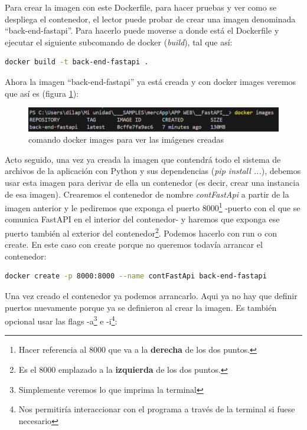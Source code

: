\documentclass[a4paper,12pt]{report}
\begin{document}
	Para crear la imagen con este Dockerfile, para hacer pruebas y ver como se despliega el contenedor, el lector puede probar de crear una imagen denominada ``back-end-fastapi''. Para hacerlo puede moverse a donde está el Dockerfile y ejecutar el siguiente subcomando de docker (\textit{build}), tal que así:
	
	\begin{lstlisting}[language=bash]
		docker build -t back-end-fastapi .
	\end{lstlisting}
	
		Ahora la imagen ``back-end-fastapi'' ya está creada y con docker images veremos que así es (figura \ref{fig:dockerimages}):
	\FloatBarrier
	\begin{figure}[H]
		\centering
		\caption{comando docker images para ver las imágenes creadas}
		\label{fig:dockerimages}
		\includegraphics[width=1\linewidth]{img/dockerImages}
	\end{figure}
	\FloatBarrier
	

	
	Acto seguido, una vez ya creada la imagen que contendrá todo el sistema de archivos de la aplicación con Python y sus dependencias (\textit{pip install ...}), debemos usar esta imagen para derivar de ella un contenedor (es decir, crear una instancia de esa imagen). Crearemos el contenedor de nombre \textit{contFastApi} a partir de la imagen anterior y le pediremos que exponga el puerto 8000\footnote{Hacer referencia al 8000 que va a la \textbf{derecha} de los dos puntos.} -puerto con el que se comunica FastAPI en el interior del contenedor- y haremos que exponga ese puerto también al exterior del contenedor\footnote{Es el 8000 emplazado a la \textbf{izquierda} de los dos puntos.}. Podemos hacerlo con run o con create. En este caso con create porque no queremos todavía arrancar el contenedor:
	
	\begin{lstlisting}[language=bash]
docker create -p 8000:8000 --name contFastApi back-end-fastapi
	\end{lstlisting}

	
	Una vez creado el contenedor ya podemos arrancarlo. Aqui ya no hay que definir puertos nuevamente porque ya se definieron al crear la imagen. Es también opcional usar las flags -a\footnote{Simplemente veremos lo que imprima la terminal} e -i\footnote{Nos permitiría interaccionar con el programa a través de la terminal si fuese necesario}:
	
\end{document}
